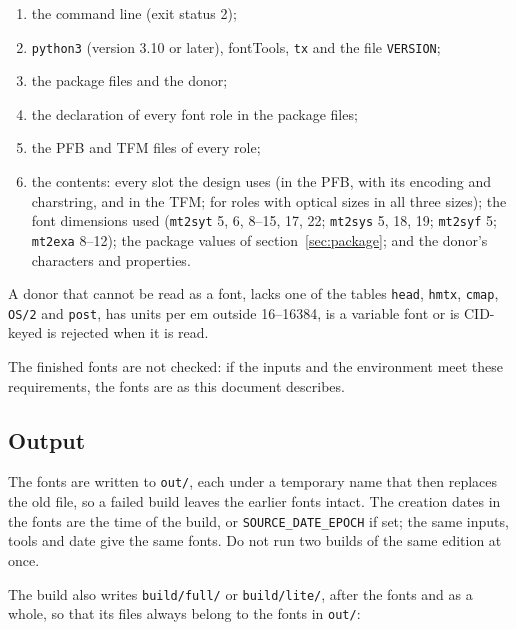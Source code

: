 \documentclass[10pt]{article}
\newcommand\file[1]{\texttt{#1}}
\newcommand\code[1]{\texttt{#1}}
\begin{document}
\begin{enumerate}
\item the command line (exit status 2);
\item \code{python3} (version 3.10 or later), fontTools, \code{tx} and
  the file \file{VERSION};
\item the package files and the donor;
\item the declaration of every font role in the package files;
\item the PFB and TFM files of every role;
\item the contents: every slot the design uses (in the PFB, with its
  encoding and charstring, and in the TFM; for roles with optical
  sizes in all three sizes); the font dimensions used (\file{mt2syt}
  5, 6, 8--15, 17, 22; \file{mt2sys} 5, 18, 19; \file{mt2syf} 5;
  \file{mt2exa} 8--12); the package values of
  section~\ref{sec:package}; and the donor's characters and properties.
\end{enumerate}

A donor that cannot be read as a font, lacks one of the tables
\code{head}, \code{hmtx}, \code{cmap}, \code{OS/2} and \code{post}, has
units per em outside 16--16384, is a variable font or is CID-keyed is
rejected when it is read.

The finished fonts are not checked: if the inputs and the environment
meet these requirements, the fonts are as this document describes.


\subsection{Output}\label{sec:output}

The fonts are written to \file{out/}, each under a temporary name that
then replaces the old file, so a failed build leaves the earlier fonts
intact.  The creation dates in the fonts are the time of the build, or
\code{SOURCE\_DATE\_EPOCH} if set; the same inputs, tools and date give
the same fonts.  Do not run two builds of the same edition at once.

The build also writes \file{build/full/} or \file{build/lite/}, after
the fonts and as a whole, so that its files always belong to the fonts
in \file{out/}:
\end{document}
